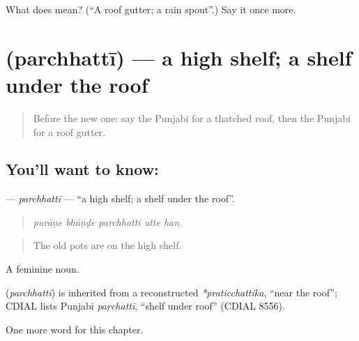 \begin{tcolorbox}[breakable,colback=teal!4,colframe=teal!35!black,title={Before you move on}]
What does  mean? (\textquotedblleft{}A roof gutter; a rain spout\textquotedblright{}.) Say it once more.
\end{tcolorbox}
\section[\texorpdfstring{\pa{ਪਰਛੱਤੀ} (parchhattī)}{ਪਰਛੱਤੀ (parchhattī)}]{ (parchhattī) — a high shelf; a shelf under the roof}

\label{lesson:PA-C246-parchhatti}



\begin{quote}
Before the new one: say the Punjabi for a thatched roof, then the Punjabi for a roof gutter.
\end{quote}

\subsection*{You'll want to know: }
\textbf{} — \emph{parchhattī} — \textquotedblleft{}a high shelf; a shelf under the roof\textquotedblright{}.

\begin{quote}
    
\end{quote}

\begin{quote}
\emph{purāṇe bhāṇḍe parchhattī utte han.}
\end{quote}

\begin{quote}
The old pots are on the high shelf.
\end{quote}

A feminine noun.

\begin{cousinweb}
\textbf{} (\emph{parchhattī}) is inherited from a reconstructed \emph{*praticchattika}, \textquotedblleft{}near the roof\textquotedblright{}; CDIAL lists Punjabi \emph{paṛchattī}, \textquotedblleft{}shelf under roof\textquotedblright{} (CDIAL 8556).
\end{cousinweb}

\begin{grammarlens}[title={What you've built}]
One more word for this chapter.
\end{grammarlens}

